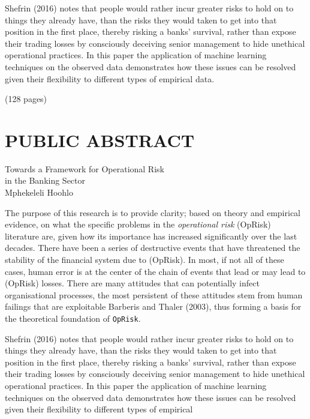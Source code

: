 \documentclass[]{DissertateUSU}
\begin{document}
Shefrin (2016) notes that people would rather incur greater risks to
hold on to things they already have, than the risks they would taken to
get into that position in the first place, thereby risking a banks'
survival, rather than expose their trading losses by consciously
deceiving senior management to hide unethical operational practices. In
this paper the application of machine learning techniques on the
observed data demonstrates how these issues can be resolved given their
flexibility to different types of empirical data.

\hspace{11 cm} (128 pages)

\singlespacing

\newpage

 \fancyhead[R]{\thepage} \fancyfoot[C]{}
\chapter*{PUBLIC ABSTRACT}

\doublespacing

\begin{center}
Towards a Framework for Operational Risk \\ 
in the Banking Sector \\
Mphekeleli Hoohlo
\end{center}

\vspace{12pt}

The purpose of this research is to provide clarity; based on theory and
empirical evidence, on what the specific problems in the
\emph{operational risk} (OpRisk) literature are, given how its
importance has increased significantly over the last decades. There have
been a series of destructive events that have threatened the stability
of the financial system due to (OpRisk). In most, if not all of these
cases, human error is at the center of the chain of events that lead or
may lead to (OpRisk) losses. There are many attitudes that can
potentially infect organisational processes, the most persistent of
these attitudes stem from human failings that are exploitable Barberis
and Thaler (2003), thus forming a basis for the theoretical foundation
of \texttt{OpRisk}.

Shefrin (2016) notes that people would rather incur greater risks to
hold on to things they already have, than the risks they would taken to
get into that position in the first place, thereby risking a banks'
survival, rather than expose their trading losses by consciously
deceiving senior management to hide unethical operational practices. In
this paper the application of machine learning techniques on the
observed data demonstrates how these issues can be resolved given their
flexibility to different types of empirical
\end{document}
